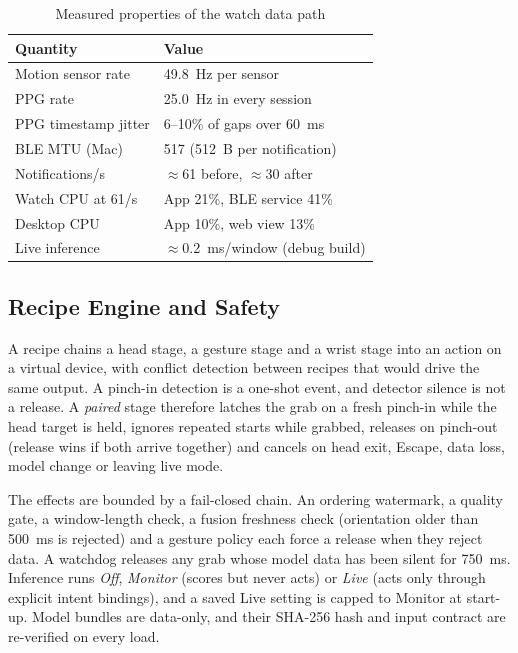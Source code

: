 \begin{table}[t]
  \centering
  \caption{Measured properties of the watch data path}
  \label{tab:datapath}
  \small
  \begin{tabular}{@{}ll@{}}
    \toprule
    Quantity & Value \\
    \midrule
    Motion sensor rate & 49.8~Hz per sensor \\
    PPG rate & 25.0~Hz in every session \\
    PPG timestamp jitter & 6--10\% of gaps over 60~ms \\
    BLE MTU (Mac) & 517 (512~B per notification) \\
    Notifications/s & $\approx$61 before, $\approx$30 after \\
    Watch CPU at 61/s & App 21\%, BLE service 41\% \\
    Desktop CPU & App 10\%, web view 13\% \\
    Live inference & $\approx$0.2~ms/window (debug build) \\
    \bottomrule
  \end{tabular}
\end{table}

\subsection{Recipe Engine and Safety}

A recipe chains a head stage, a gesture stage and a wrist stage into an action on a virtual device, with conflict detection between recipes that would drive the same output. A pinch-in detection is a one-shot event, and detector silence is not a release. A \emph{paired} stage therefore latches the grab on a fresh pinch-in while the head target is held, ignores repeated starts while grabbed, releases on pinch-out (release wins if both arrive together) and cancels on head exit, Escape, data loss, model change or leaving live mode.

The effects are bounded by a fail-closed chain. An ordering watermark, a quality gate, a window-length check, a fusion freshness check (orientation older than 500~ms is rejected) and a gesture policy each force a release when they reject data. A watchdog releases any grab whose model data has been silent for 750~ms. Inference runs \emph{Off}, \emph{Monitor} (scores but never acts) or \emph{Live} (acts only through explicit intent bindings), and a saved Live setting is capped to Monitor at start-up. Model bundles are data-only, and their SHA-256 hash and input contract are re-verified on every load.

